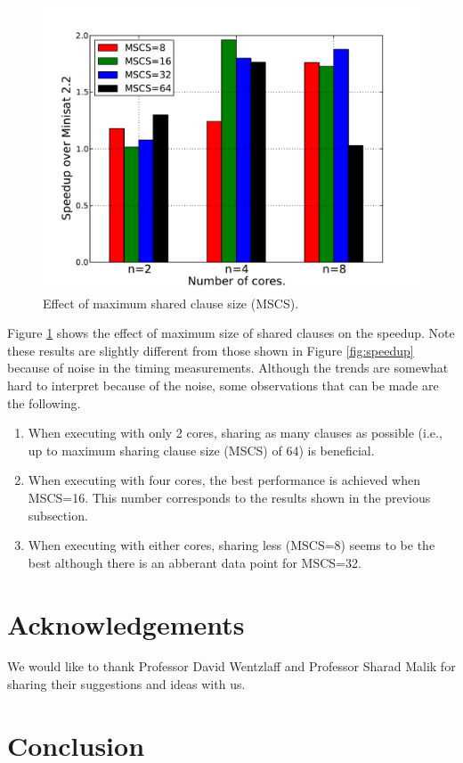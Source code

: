 \documentclass[letterpaper, compsoc, conference]{IEEEtran}
\begin{document}
\begin{figure}[htbp]
    \begin{center}
        \includegraphics[width=\columnwidth]{images/mcs.pdf}
        \caption{Effect of maximum shared clause size (MSCS).}
        \label{fig:mscs}
    \end{center}
\end{figure}

Figure \ref{fig:mscs} shows the effect of maximum size of shared clauses on the
speedup. Note these results are slightly different from those shown in Figure
\ref{fig:speedup} because of noise in the timing measurements. Although the
trends are somewhat hard to interpret because of the noise, some observations
that can be made are the following.

\begin{enumerate}

\item When executing with only 2 cores, sharing as many clauses as possible
(i.e., up to maximum sharing clause size (MSCS) of 64) is beneficial.

\item When executing with four cores, the best performance is achieved when
MSCS=16. This number corresponds to the results shown in the previous
subsection.

\item When executing with either cores, sharing less (MSCS=8) seems to be the
best although there is an abberant data point for MSCS=32.
      
\end{enumerate}


\section*{Acknowledgements}

We would like to thank Professor David Wentzlaff and Professor Sharad Malik for
sharing their suggestions and ideas with us.

\section{Conclusion}
\label{sec:finish}



\end{document}
